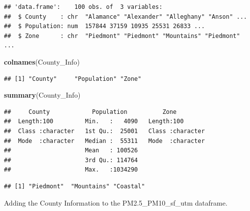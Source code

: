 \documentclass[12pt,]{article}
\newenvironment{Shaded}{\begin{snugshade}}{\end{snugshade}}
\newcommand{\KeywordTok}[1]{\textcolor[rgb]{0.13,0.29,0.53}{\textbf{#1}}}
\newcommand{\DataTypeTok}[1]{\textcolor[rgb]{0.13,0.29,0.53}{#1}}
\newcommand{\StringTok}[1]{\textcolor[rgb]{0.31,0.60,0.02}{#1}}
\newcommand{\OperatorTok}[1]{\textcolor[rgb]{0.81,0.36,0.00}{\textbf{#1}}}
\newcommand{\NormalTok}[1]{#1}
\begin{document}
\begin{verbatim}
## 'data.frame':    100 obs. of  3 variables:
##  $ County    : chr  "Alamance" "Alexander" "Alleghany" "Anson" ...
##  $ Population: num  157844 37159 10935 25531 26833 ...
##  $ Zone      : chr  "Piedmont" "Piedmont" "Mountains" "Piedmont" ...
\end{verbatim}

\begin{Shaded}
\begin{Highlighting}[]
\KeywordTok{colnames}\NormalTok{(County_Info)}
\end{Highlighting}
\end{Shaded}

\begin{verbatim}
## [1] "County"     "Population" "Zone"
\end{verbatim}

\begin{Shaded}
\begin{Highlighting}[]
\KeywordTok{summary}\NormalTok{(County_Info)}
\end{Highlighting}
\end{Shaded}

\begin{verbatim}
##     County            Population          Zone          
##  Length:100         Min.   :   4090   Length:100        
##  Class :character   1st Qu.:  25001   Class :character  
##  Mode  :character   Median :  55311   Mode  :character  
##                     Mean   : 100526                     
##                     3rd Qu.: 114764                     
##                     Max.   :1034290
\end{verbatim}

\begin{Shaded}
\end{Shaded}

\begin{verbatim}
## [1] "Piedmont"  "Mountains" "Coastal"
\end{verbatim}

Adding the County Information to the PM2.5\_PM10\_sf\_utm dataframe.

\begin{Shaded}
\end{Shaded}
\end{document}
